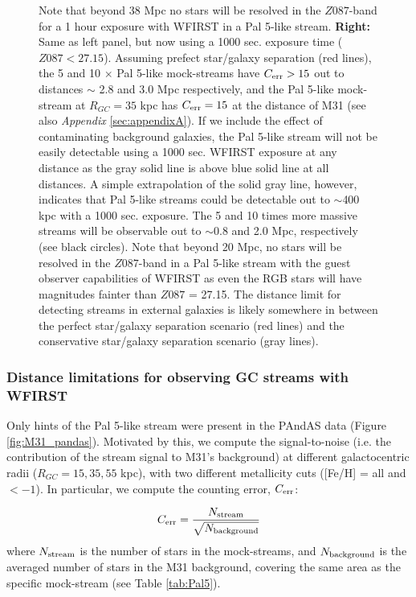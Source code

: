 \documentclass[twocolumn]{aastex62}
\begin{document}
\begin{figure*}
{Note that beyond 38 Mpc no stars will be resolved in the $Z087$-band for a 1 hour exposure with WFIRST in a Pal 5-like stream.
{\bf Right:} Same as left panel, but now using a 1000 sec. exposure time ($Z087 < 27.15$).  
Assuming prefect star/galaxy separation (red lines), the 5 and 10 $\times$  Pal 5-like mock-streams have $C_{\rm err} > 15$ out to distances $\sim$ 2.8 and 3.0 Mpc respectively, and the Pal 5-like mock-stream at $R_{GC} = 35$ kpc has $C_{\rm err} = 15$ at the distance of M31 (see also {\it Appendix} \ref{sec:appendixA}). If we include the effect of contaminating background galaxies, the Pal 5-like stream will not be easily detectable using a 1000 sec. WFIRST exposure at any distance as the gray solid line is above blue solid line at all distances. A simple extrapolation of the solid gray line, however, indicates that Pal 5-like streams could be detectable out to $\sim$400 kpc with a 1000 sec. exposure. 
The 5 and 10 times more massive streams will be observable out to $\sim$0.8 and 2.0 Mpc, respectively (see black circles). Note that beyond 20 Mpc, no stars will be resolved in the $Z087$-band in a Pal 5-like stream with the guest observer capabilities of WFIRST as even the RGB stars will have magnitudes fainter than $Z087$ = 27.15. The distance limit for detecting streams in external galaxies is likely somewhere in between the perfect star/galaxy separation scenario (red lines) and the conservative star/galaxy separation scenario (gray lines).
}
\label{fig:distance}
\end{figure*}

\subsubsection{Distance limitations for observing GC streams with WFIRST}
\label{sec:Cerr}
Only hints of the Pal 5-like stream were present in the PAndAS data (Figure \ref{fig:M31_pandas}). Motivated by this, we compute the signal-to-noise (i.e. the contribution of the stream signal to M31's background) at different galactocentric radii ($R_{GC} = 15, 35, 55$ kpc), with two different metallicity cuts ([Fe/H] = all and $< -1$).  In particular, we compute the counting error, $C_{\rm err}$: 

\begin{equation}
\label{eq:cerr}
{C}_{\rm err} = \frac{N_{\rm stream}}{\sqrt{N_{\rm background}}}
\end{equation}
where $N_{\rm stream}$ is the number of stars in the mock-streams, and $N_{\rm background}$ is the  averaged number of stars in the M31 background, covering the same area as the specific mock-stream (see Table \ref{tab:Pal5}). 
\end{document}
